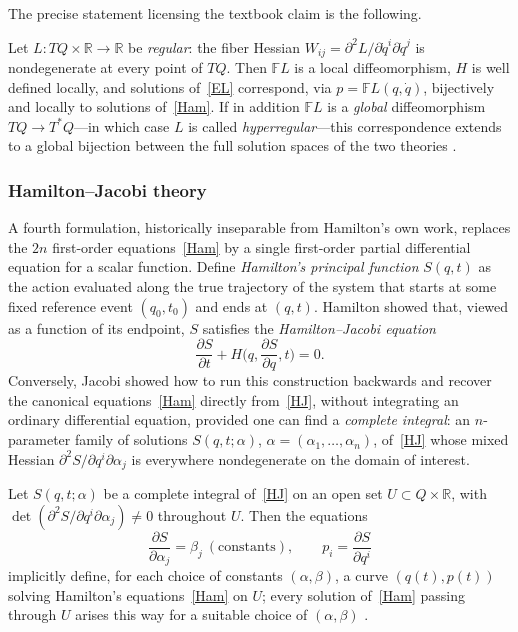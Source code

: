 The precise statement licensing the textbook claim is the following.

\begin{proposition}
\label{prop:regular}
Let $L: TQ\times\mathbb{R}\to\mathbb{R}$ be \emph{regular}: the fiber Hessian
    $W_{ij} = \partial^2 L/\partial \dot q^i \partial \dot q^j$ is
    nondegenerate at every point of $TQ$. Then $\mathbb{F}L$ is a local
    diffeomorphism, $H$ is well defined locally, and solutions of~\eqref{EL}
    correspond, via $p = \mathbb{F}L(q,\dot q)$, bijectively and locally to
    solutions of~\eqref{Ham}. If in addition $\mathbb{F}L$ is a \emph{global}
    diffeomorphism $TQ \to T^*Q$---in which case $L$ is called
    \emph{hyperregular}---this correspondence extends to a global bijection
    between the full solution spaces of the two theories
    \cite{abrahammarsden}.
\end{proposition}

\subsubsection{Hamilton--Jacobi theory}
\label{hjtheory}

A fourth formulation, historically inseparable from Hamilton's own work,
replaces the $2n$ first-order equations~\eqref{Ham} by a single first-order
partial differential equation for a scalar function. Define \emph{Hamilton's
principal function} $S(q,t)$ as the action evaluated along the true trajectory
of the system that starts at some fixed reference event $(q_0,t_0)$ and ends at
$(q,t)$. Hamilton showed that, viewed as a function of its endpoint, $S$
satisfies the \emph{Hamilton--Jacobi equation}
\begin{equation}
\label{HJ}
\frac{\partial S}{\partial t}+H\Big(q,\frac{\partial S}{\partial q},t\Big)=0.
\end{equation}
Conversely, Jacobi showed how to run this construction backwards and recover
the canonical equations~\eqref{Ham} directly from~\eqref{HJ}, without
integrating an ordinary differential equation, provided one can find a
\emph{complete integral}: an $n$-parameter family of solutions $S(q,t;\alpha)$,
$\alpha=(\alpha_1,\dots,\alpha_n)$, of~\eqref{HJ} whose mixed Hessian
$\partial^2 S/\partial q^i\partial \alpha_j$ is everywhere nondegenerate on the
domain of interest.

\begin{proposition}
\label{prop:jacobi-thm}
Let $S(q,t;\alpha)$ be a complete integral of~\eqref{HJ} on an open set
    $U\subset Q\times\mathbb{R}$, with $\det(\partial^2 S/\partial
    q^i\partial\alpha_j)\neq 0$ throughout $U$. Then the equations
\begin{equation}
\frac{\partial S}{\partial\alpha_j} = \beta_j \ (\text{constants}), 
    \qquad p_i = \frac{\partial S}{\partial q^i}
\end{equation}
implicitly define, for each choice of constants $(\alpha,\beta)$, a curve
    $(q(t),p(t))$ solving Hamilton's equations~\eqref{Ham} on $U$; every
    solution of~\eqref{Ham} passing through $U$ arises this way for a suitable
    choice of $(\alpha,\beta)$ \cite{arnold1989,goldstein2001}.
\end{proposition}

